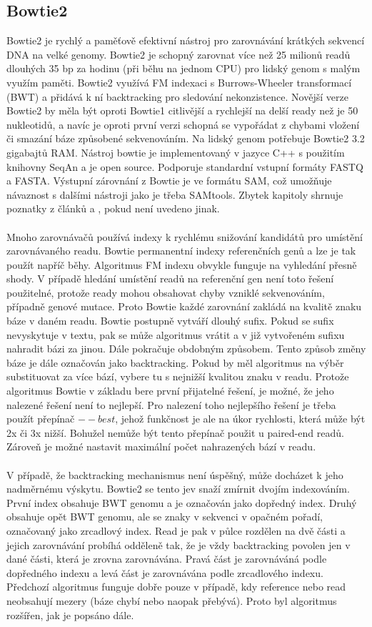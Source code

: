 \documentclass[czech,DP]{thesiskiv}
\numberwithin{equation}{section}
\begin{document}
\subsection{Bowtie2}
Bowtie2 je rychlý a paměťově efektivní nástroj pro zarovnávání krátkých sekvencí DNA na velké genomy. Bowtie2 je schopný zarovnat více než 25 milionů readů dlouhých 35 bp za hodinu (při běhu na jednom CPU) pro lidský genom s malým využím paměti. Bowtie2 využívá FM indexaci s Burrows-Wheeler transformací (BWT) a přidává k ní backtracking pro sledování nekonzistence. Novější verze Bowtie2 by měla být oproti Bowtie1 citlivější a rychlejší na delší ready než je 50 nukleotidů, a navíc je oproti první verzi schopná se vypořádat z chybami vložení či smazání báze způsobené sekvenováním. Na lidský genom potřebuje Bowtie2 3.2 gigabajtů RAM. Nástroj bowtie je implementovaný v jazyce C++ s použitím knihovny SeqAn a je open source. Podporuje standardní vstupní formáty FASTQ a FASTA.  Výstupní zárovnání z Bowtie je ve formátu SAM, což umožňuje návaznost s dalšími nástroji jako je třeba SAMtools. Zbytek kapitoly shrnuje poznatky z článků \cite{bowtie} a \cite{bowtie2}, pokud není uvedeno jinak.   
\\
\\
Mnoho zarovnávačů používá indexy k rychlému snižování kandidátů pro umístění zarovnávaného readu. Bowtie permanentní indexy referenčních genů a lze je tak použít napříč běhy. Algoritmus FM indexu obvykle funguje na vyhledání přesně shody. V případě hledání umístění readů na referenční gen není toto řešení použitelné, protože ready mohou obsahovat chyby vzniklé sekvenováním, případně genové mutace. Proto Bowtie každé zarovnání zakládá na kvalitě znaku báze v daném readu. Bowtie postupně vytváří dlouhý sufix. Pokud se sufix nevyskytuje v textu, pak se může algoritmus vrátit a v již vytvořeném sufixu nahradit bázi za jinou. Dále pokračuje obdobným způsobem. Tento způsob změny báze je dále označován jako backtracking. Pokud by měl algoritmus na výběr substituovat za více bází, vybere tu s nejnižší kvalitou znaku v readu. Protože algoritmus Bowtie v základu bere první přijatelné řešení, je možné, že jeho nalezené řešení není to nejlepší. Pro nalezení toho nejlepšího řešení je třeba použít přepínač $--best$, jehož funkčnost je ale na úkor rychlosti, která může být 2x či 3x nižší. Bohužel nemůže být tento přepínač použit u paired-end readů. Zároveň je možné nastavit maximální počet nahrazených bází v readu. \cite{bowtie}
\\
\\
V případě, že backtracking mechanismus není úspěšný, může docházet k jeho nadměrnému výskytu. Bowtie2 se tento jev snaží zmírnit dvojím indexováním. První index obsahuje BWT genomu a je označován jako dopředný index. Druhý obsahuje opět BWT genomu, ale se znaky v sekvenci v opačném pořadí, označovaný jako zrcadlový index. Read je pak v půlce rozdělen na dvě části a jejich zarovnávání probíhá odděleně tak, že je vždy backtracking povolen jen v dané části, která je zrovna zarovnávána. Pravá část je zarovnáváná podle dopředného indexu a levá část je zarovnávána podle zrcadlového indexu. Předchozí algoritmus funguje dobře pouze v případě, kdy reference nebo read neobsahují mezery (báze chybí nebo naopak přebývá). Proto byl algoritmus rozšířen, jak je popsáno dále.
\end{document}
